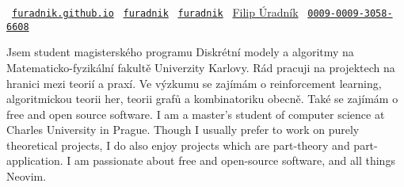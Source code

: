\vspace{.5em}

\begin{center}
	\small
	\hspace{.5in}
	\faGlobe\ \texttt{\href{https://furadnik.github.io}{furadnik.github.io}}
	\hfill
	\faGithub\ \texttt{\href{https://github.com/furadnik}{furadnik}}                                                                      
	\hfill
	\faLinkedin\ \texttt{\href{https://www.linkedin.com/in/furadnik/}{furadnik}}
	\hfill
	\aiGoogleScholarSquare\ \href{https://scholar.google.com/citations?user=7AvTiqgAAAAJ}{Filip Úradník}
	\hfill
	\aiOrcid\ \texttt{\href{https://orcid.org/0009-0009-3058-6608}{0009-0009-3058-6608}}
	\hspace{.5in}

\end{center}

\begin{intro}
	\lng
	{
		Jsem student magisterského programu Diskrétní modely a algoritmy na Matematicko-fyzikální fakultě Univerzity Karlovy.
		Rád pracuji na projektech na hranici mezi teorií a praxí.
		Ve výzkumu se zajímám o reinforcement learning, algoritmickou teorii her, teorii grafů a kombinatoriku obecně.
		Také se zajímám o free and open source software.
	}{
		I am a master's student of computer science at Charles University in Prague.
		Though I usually prefer to work on purely theoretical projects, I do also enjoy projects which are part-theory and part-application.
		I am passionate about free and open-source software, and all things Neovim.
	}
\end{intro}


